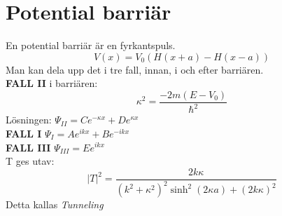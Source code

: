 \documentclass{article}
\begin{document}
\section{Potential barriär}
  En potential barriär är en fyrkantspuls.
  \[
    V(x) = V_0(H(x+a)-H(x-a))
  \]
  Man kan dela upp det i tre fall, innan, i och efter barriären.\\

  \textbf{FALL II} i barriären:
  \[
    \kappa^2 = \frac{-2m(E-V_0)}{\hbar^2}
  \]
Lösningen: $\Psi_{II}=Ce^{-\kappa x}+De^{\kappa x}$\\

\textbf{FALL I} $\Psi_I=Ae^{ikx}+Be^{-ikx}$\\

\textbf{FALL III} $\Psi_{III}=Ee^{ikx}$\\

T ges utav:
\[
  |T|^2=\frac{2k\kappa}{(k^2+\kappa^2)^2\sinh^2{(2\kappa a)}+(2k\kappa)^2}
\]
Detta kallas \textit{Tunneling}
\end{document}
